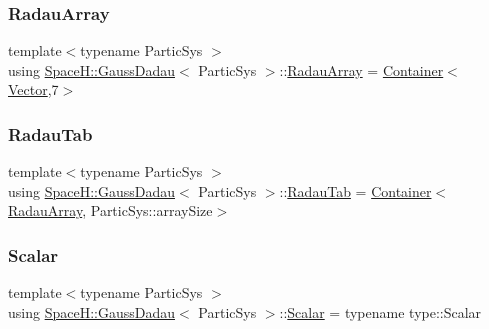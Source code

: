 \mbox{\label{class_space_h_1_1_gauss_dadau_abe198802fcc0899c1f4d472ac989b845}} 
\subsubsection{\texorpdfstring{Radau\+Array}{RadauArray}}
{\footnotesize\ttfamily template$<$typename Partic\+Sys $>$ \\
using \mbox{\hyperlink{class_space_h_1_1_gauss_dadau}{Space\+H\+::\+Gauss\+Dadau}}$<$ Partic\+Sys $>$\+::\mbox{\hyperlink{class_space_h_1_1_gauss_dadau_abe198802fcc0899c1f4d472ac989b845}{Radau\+Array}} =  \mbox{\hyperlink{class_space_h_1_1_gauss_dadau_adccd45f5653523a6ae7bb0da0c244b5d}{Container}}$<$\mbox{\hyperlink{class_space_h_1_1_gauss_dadau_a2019bc4c1ee812f59a32f9273c84f5be}{Vector}},7$>$}

\mbox{\label{class_space_h_1_1_gauss_dadau_aa191c67a1447ce70b7ec2dae6b061176}} 
\subsubsection{\texorpdfstring{Radau\+Tab}{RadauTab}}
{\footnotesize\ttfamily template$<$typename Partic\+Sys $>$ \\
using \mbox{\hyperlink{class_space_h_1_1_gauss_dadau}{Space\+H\+::\+Gauss\+Dadau}}$<$ Partic\+Sys $>$\+::\mbox{\hyperlink{class_space_h_1_1_gauss_dadau_aa191c67a1447ce70b7ec2dae6b061176}{Radau\+Tab}} =  \mbox{\hyperlink{class_space_h_1_1_gauss_dadau_adccd45f5653523a6ae7bb0da0c244b5d}{Container}}$<$\mbox{\hyperlink{class_space_h_1_1_gauss_dadau_abe198802fcc0899c1f4d472ac989b845}{Radau\+Array}}, Partic\+Sys\+::array\+Size$>$}

\mbox{\label{class_space_h_1_1_gauss_dadau_ace42540e9fb47d7f1d1f00622bbd1ccb}} 
\subsubsection{\texorpdfstring{Scalar}{Scalar}}
{\footnotesize\ttfamily template$<$typename Partic\+Sys $>$ \\
using \mbox{\hyperlink{class_space_h_1_1_gauss_dadau}{Space\+H\+::\+Gauss\+Dadau}}$<$ Partic\+Sys $>$\+::\mbox{\hyperlink{class_space_h_1_1_gauss_dadau_ace42540e9fb47d7f1d1f00622bbd1ccb}{Scalar}} =  typename type\+::\+Scalar}

